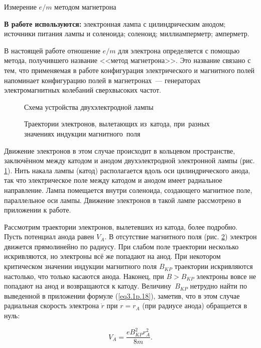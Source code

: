 {\Large Измерение ${e/m}$ методом магнетрона}

{\bf В работе используются: }{электронная лампа с цилиндрическим анодом; источники питания лампы и соленоида; соленоид; миллиамперметр; амперметр.}

В настоящей работе отношение $e/m$ для электрона определяется с помощью метода, получившего название <<метод
магнетрона>>. Это название связано с тем, что применяемая в работе конфигурация электрического и магнитного полей
напоминает конфигурацию полей в магнетронах~--- генераторах электромагнитных колебаний сверхвысоких частот.

\begin{figure}
\caption{Схема устройства двухэлектродной лампы}
\label{fig3.1.2}
\end{figure}

\begin{figure}
\caption{Траектории электронов, вылетающих из~катода, при~разных значениях индукции магнитного~поля}
\label{fig3.1.3}
\end{figure}

Движение электронов в этом случае происходит в кольцевом пространстве, заключённом между катодом и анодом
двухэлектродной электронной лампы (рис. \ref{fig3.1.2}). Нить накала лампы (катод) располагается вдоль оси цилиндрического анода, так что электрическое поле между катодом и анодом имеет радиальное направление. Лампа помещается внутри соленоида, создающего магнитное поле, параллельное оси лампы. Движение электронов в такой лампе рассмотрено в приложении к работе.

Рассмотрим траектории электронов, вылетевших из катода, более подробно. Пусть потенциал анода равен $V_A$. В отсутствие магнитного поля (рис. \ref{fig3.1.3}) электрон движется прямолинейно по радиусу. При слабом поле траектории несколько искривляются, но электроны всё же попадают на анод. При некотором критическом значении индукции магнитного поля $B_{KP}$ траектории искривляются настолько, что только касаются анода. Наконец, при $B>B_{KP}$ электроны вовсе не попадают на анод и возвращаются к катоду. Величину~$B_{KP}$ нетрудно найти по выведенной в приложении формуле (\ref{eq3.1p.18}), заметив, что в этом случае радиальная скорость электрона $\dot{r}$ при $r=r_A$ (при радиусе анода) обращается в нуль:

\begin{equation}
V_A=\frac{eB_{KP}^2r_A^2}{8m}.
\label{eq3.1.19}
\end{equation}


